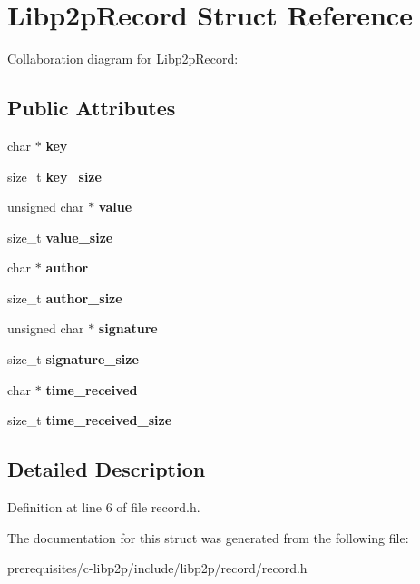 \hypertarget{struct_libp2p_record}{}\section{Libp2p\+Record Struct Reference}
\label{struct_libp2p_record}


Collaboration diagram for Libp2p\+Record\+:
\subsection*{Public Attributes}
\begin{DoxyCompactItemize}
\item 
\mbox{\label{struct_libp2p_record_a642d0f91eaf69b03f54256e694d58540}} 
char $\ast$ {\bfseries key}
\item 
\mbox{\label{struct_libp2p_record_a266abf78c809eaf37b5be05f27bc5d39}} 
size\+\_\+t {\bfseries key\+\_\+size}
\item 
\mbox{\label{struct_libp2p_record_a6e3b447bf712834de8ad93e63c306270}} 
unsigned char $\ast$ {\bfseries value}
\item 
\mbox{\label{struct_libp2p_record_a769760eacaf925c55e84231c776c5997}} 
size\+\_\+t {\bfseries value\+\_\+size}
\item 
\mbox{\label{struct_libp2p_record_a55ae2d36a7ca139e9832fc4e956b3684}} 
char $\ast$ {\bfseries author}
\item 
\mbox{\label{struct_libp2p_record_a7e01ccfc70ff4a9e0ed6ad127fb92bbe}} 
size\+\_\+t {\bfseries author\+\_\+size}
\item 
\mbox{\label{struct_libp2p_record_af3b1f122962604ab58caa78dd68328d3}} 
unsigned char $\ast$ {\bfseries signature}
\item 
\mbox{\label{struct_libp2p_record_a29f83ea4151aac93556190f01fc3968c}} 
size\+\_\+t {\bfseries signature\+\_\+size}
\item 
\mbox{\label{struct_libp2p_record_aa62385c5406390413547a4a5f560b2f7}} 
char $\ast$ {\bfseries time\+\_\+received}
\item 
\mbox{\label{struct_libp2p_record_a2b5b563220a57b841e835f3398039b8b}} 
size\+\_\+t {\bfseries time\+\_\+received\+\_\+size}
\end{DoxyCompactItemize}


\subsection{Detailed Description}


Definition at line 6 of file record.\+h.



The documentation for this struct was generated from the following file\+:\begin{DoxyCompactItemize}
\item 
prerequisites/c-\/libp2p/include/libp2p/record/record.\+h\end{DoxyCompactItemize}
